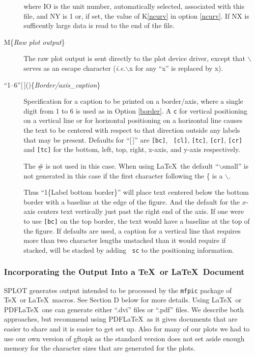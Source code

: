\documentclass[twoside]{MATH77}
\begin{document}
\begin{multicols}{2}
\begin{description}
where IO is the unit number, automatically selected, associated with this
file, and NY is 1 or, if set, the value of K\ref{ncurv} in option
\ref{ncurv}.  If NX is sufficently large data is read to the end of
the file.
\item[M\{{\em Raw plot output}\}]The raw plot output is sent
directly to the plot device driver, except that $\backslash$ serves
as an escape character ({\em i.e.}$\backslash$x for any ``x'' is replaced
by x).
\item[``1--6''\hbox{[\,]}()\{{\em Border/axis\_caption}\}] Specification
for a caption to be printed on a border/axis, where a single digit from 1
to 6 is used as in Option \ref{border}.  A {\tt c} for vertical positioning
on a vertical line or for horizontal positioning on a horizontal line
causes the text to be centered with respect to that direction outside any
labels that may be present.  Defaults for ``[\,]'' are {\tt [bc]}, {\tt
[cl]}, {\tt [tc]}, {\tt [cr]}, {\tt [cr]} and {\tt [tc]} for the bottom,
left, top, right, x-axis, and y-axis respectively.

The \# is not used in this case.  When using \LaTeX \ the default
``$\backslash$small'' is not generated in this case if the first
character following the \{ is a $\backslash$.

Thus ``1\{Label bottom border\}'' will place text centered below the
bottom border with a baseline at the edge of the figure.  And the default
for the $x$-axis centers text vertically just past the right end of the
axis.  If one were to use {\tt [bc]} on the top border, the text would
have a baseline at the top of the figure.  If defaults are used, a caption
for a vertical line that requires more than two character lengths
unstacked than it would require if stacked, will be stacked by adding {\tt
sc} to the positioning information.
\end{description}

\subsubsection{Incorporating the Output Into a \TeX\ or \LaTeX\
Document\label{IntoTeX}}

SPLOT generates output intended to be processed by the {\tt mfpic}
package of \TeX\ or \LaTeX\ macros.  See Section D below for more
details.  Using \LaTeX\ or PDF\LaTeX\ one can generate either ``.dvi''
files or ``.pdf'' files.  We describe both approaches, but recommend
using PDF\LaTeX\ as it gives documents that are easier to share and it
is easier to get set up.  Also for many of our plots we had to use our
own version of gftopk as the standard version does not set aside
enough memory for the character sizes that are generated for the
plots.


\end{multicols}
\end{document}
